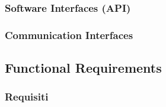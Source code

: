 \documentclass[english]{article}
\begin{document}
\subsubsection{Software Interfaces (API)}

\subsubsection{Communication Interfaces}

\newpage
\subsection{Functional Requirements}

\subsubsection{Requisiti}
\end{document}

